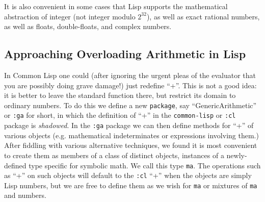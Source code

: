 \documentclass{article}
\begin{document}
It is also convenient in some cases that Lisp supports the mathematical
abstraction of integer (not integer modulo $2^{32}$), as well as
exact rational numbers, as well as floats, double-floats,
and complex numbers.

\subsection{Approaching Overloading Arithmetic in Lisp}

In Common Lisp one could (after ignoring the urgent pleas 
of the evaluator that you are possibly doing grave damage!) just redefine
``+''.  This is not a good idea: it is better to leave the standard
function there, but restrict its domain to ordinary numbers. To do this we
 define a new {\tt package}, say
``GenericArithmetic'' or {\tt :ga} for short, in which the definition
of ``+'' in the {\tt common-lisp} or {\tt :cl} package is {\em
shadowed}.  In the {\tt :ga} package we can then define methods for
``+'' of various objects (e.g. mathematical indeterminates or
expressions involving them.) After fiddling with various alternative
techniques, we found it is most convenient to create them as members of a class
of distinct objects, instances of a newly-defined type specific for
symbolic math. We call this type {\tt ma}. The operations such as
``+'' on such objects will default to the {\tt :cl} ``+'' when the
objects are simply Lisp numbers, but we are free to define them as
we wish for {\tt ma} or mixtures of {\tt ma} and numbers.
\end{document}
